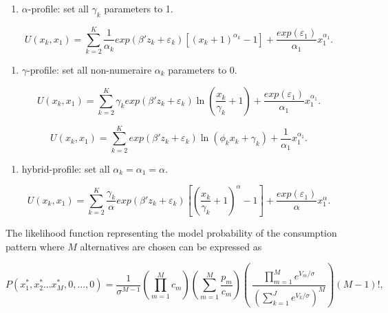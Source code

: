 \begin{enumerate}
\def\labelenumi{\arabic{enumi}.}
\tightlist
\item
  \(\alpha\)-profile: set all \(\gamma_k\) parameters to 1.
\end{enumerate}

\begin{equation}
\label{eq:alpha}
U(x_k, x_1) = \sum_{k=2}^{K} \frac{1}{\alpha_k}exp(\beta'z_k+\varepsilon_k) \left[ \left( x_k + 1 \right)^{\alpha_k} - 1 \right] + \frac{exp(\varepsilon_1)}{\alpha_1}x_1^{\alpha_1}.
\end{equation}

\begin{enumerate}
\def\labelenumi{\arabic{enumi}.}
\setcounter{enumi}{1}
\tightlist
\item
  \(\gamma\)-profile: set all non-numeraire \(\alpha_k\) parameters to
  0.
\end{enumerate}

\begin{equation}
\label{eq:gamma}
U(x_k, x_1) = \sum_{k=2}^{K} \gamma_k exp(\beta'z_k+\varepsilon_k) \ln\left( \frac{x_k}{\gamma_k} + 1 \right) + \frac{exp(\varepsilon_1)}{\alpha_1}x_1^{\alpha_1}.
\end{equation}

\begin{equation}
\label{eq:gamma}
U(x_k, x_1) = \sum_{k=2}^{K} exp(\beta'z_k+\varepsilon_k) \ln\left( \phi_k x_k + \gamma_k \right) + \frac{1}{\alpha_1}x_1^{\alpha_1}.
\end{equation}

\begin{enumerate}
\def\labelenumi{\arabic{enumi}.}
\setcounter{enumi}{2}
\tightlist
\item
  hybrid-profile: set all \(\alpha_k=\alpha_1=\alpha\).
\end{enumerate}

\begin{equation}
\label{eq:hybrid}
U(x_k, x_1) = \sum_{k=2}^{K} \frac{\gamma_k}{\alpha} exp(\beta'z_k+\varepsilon_k) \left[ \left( \frac{x_k}{\gamma_k} + 1 \right)^{\alpha} - 1 \right] + \frac{exp(\varepsilon_1)}{\alpha}x_1^{\alpha}.
\end{equation}

The likelihood function representing the model probability of the
consumption pattern where \(M\) alternatives are chosen can be expressed
as \citet{bhatmultiple2008}

\begin{equation}
\label{eq:ll_base}
P(x^{*}_1,x^{*}_2...x^{*}_M,0,...,0) = \frac{1}{\sigma^{M-1}} \left(\prod_{m=1}^M c_m \right)\left(\sum_{m=1}^M \frac{p_m}{c_m} \right) \left( \ \frac{\prod_{m=1}^M e^{V_m/\sigma}}{ \left( \sum_{k=1}^J e^{V_k/\sigma} \right)^M }\right)(M-1)!,
\end{equation}

